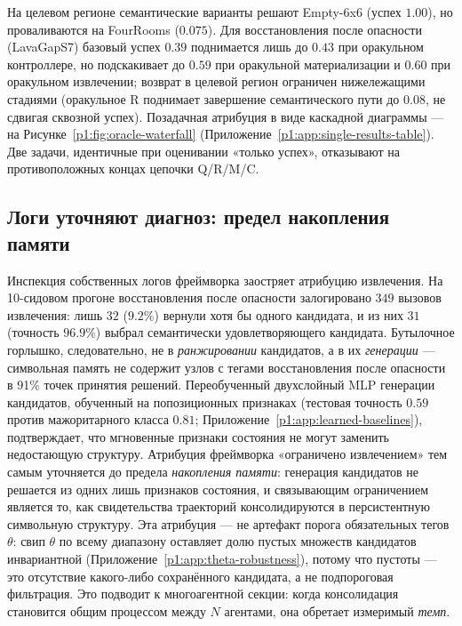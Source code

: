 \documentclass{article}
\begin{document}
На целевом регионе семантические варианты решают Empty-6x6 (успех $1.00$), но проваливаются на FourRooms ($0.075$). Для восстановления после опасности (LavaGapS7) базовый успех $0.39$ поднимается лишь до $0.43$ при оракульном контроллере, но подскакивает до $0.59$ при оракульной материализации и $0.60$ при оракульном извлечении; возврат в целевой регион ограничен нижележащими стадиями (оракульное R поднимает завершение семантического пути до $0.08$, не сдвигая сквозной успех). Позадачная атрибуция в виде каскадной диаграммы --- на Рисунке~\ref{p1:fig:oracle-waterfall} (Приложение~\ref{p1:app:single-results-table}). Две задачи, идентичные при оценивании «только успех», отказывают на противоположных концах цепочки Q/R/M/C.

\subsection{Логи уточняют диагноз: предел накопления памяти}
\label{p1:sec:refined-attribution}

Инспекция собственных логов фреймворка заостряет атрибуцию извлечения. На 10-сидовом прогоне восстановления после опасности залогировано $349$ вызовов извлечения: лишь $32$ ($9.2\%$) вернули хотя бы одного кандидата, и из них $31$ (точность $96.9\%$) выбрал семантически удовлетворяющего кандидата. Бутылочное горлышко, следовательно, не в \emph{ранжировании} кандидатов, а в их \emph{генерации} --- символьная память не содержит узлов с тегами восстановления после опасности в 91\% точек принятия решений. Переобученный двухслойный MLP генерации кандидатов, обученный на попозиционных признаках (тестовая точность $0.59$ против мажоритарного класса $0.81$; Приложение~\ref{p1:app:learned-baselines}), подтверждает, что мгновенные признаки состояния не могут заменить недостающую структуру. Атрибуция фреймворка «ограничено извлечением» тем самым уточняется до предела \emph{накопления памяти}: генерация кандидатов не решается из одних лишь признаков состояния, и связывающим ограничением является то, как свидетельства траекторий консолидируются в персистентную символьную структуру. Эта атрибуция --- не артефакт порога обязательных тегов $\theta$: свип $\theta$ по всему диапазону оставляет долю пустых множеств кандидатов инвариантной (Приложение~\ref{p1:app:theta-robustness}), потому что пустоты --- это отсутствие какого-либо сохранённого кандидата, а не подпороговая фильтрация. Это подводит к многоагентной секции: когда консолидация становится общим процессом между $N$ агентами, она обретает измеримый \emph{темп}.
\end{document}
